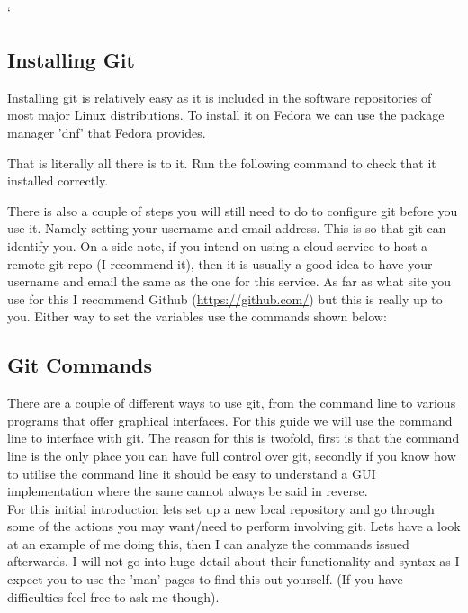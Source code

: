 `\documentclass[a4paper,11pt]{report}
\begin{document}
\begin{description}
							\subsection{Installing Git}
								Installing git is relatively easy as it is included in the software repositories of most major Linux distributions.
								To install it on Fedora we can use the package manager 'dnf' that Fedora provides.

								

								That is literally all there is to it. Run the following command to check that it installed correctly.

								

								There is also a couple of steps you will still need to do to configure git before you use it.
								Namely setting your username and email address.
								This is so that git can identify you.
								On a side note, if you intend on using a cloud service to host a remote git repo (I recommend it), then it is usually a good idea to have your username and email the same as the one for this service.
								As far as what site you use for this I recommend Github (\url{https://github.com/}) but this is really up to you.
								Either way to set the variables use the commands shown below:

								

						\subsection{Git Commands}
							There are a couple of different ways to use git, from the command line to various programs that offer graphical interfaces.
							For this guide we will use the command line to interface with git.
							The reason for this is twofold, first is that the command line is the only place you can have full control over git, secondly if you know how to utilise the command line it should be easy to understand a GUI implementation where the same cannot always be said in reverse.\\

							For this initial introduction lets set up a new local repository and go through some of the actions you may want/need to perform involving git.
							Lets have a look at an example of me doing this, then I can analyze the commands issued afterwards.
							I will not go into huge detail about their functionality and syntax as I expect you to use the 'man' pages to find this out yourself.
							(If you have difficulties feel free to ask me though).


\end{description}
\end{document}
